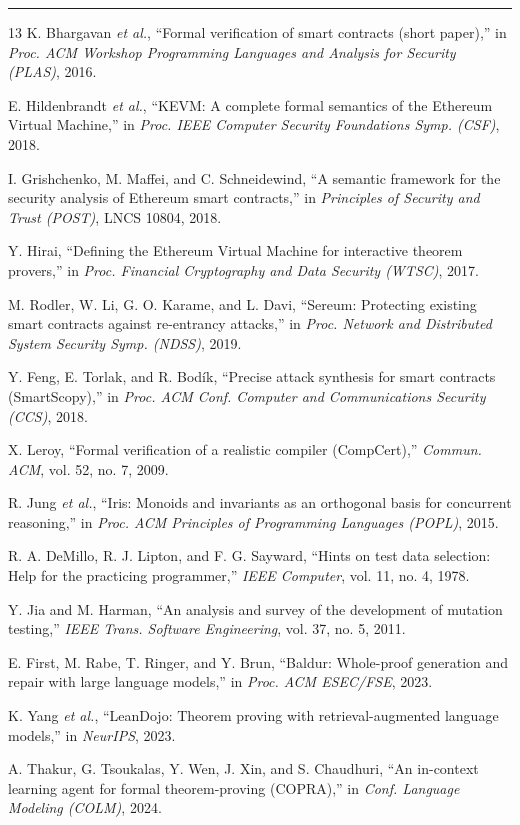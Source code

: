 \begin{center}\rule{0.5\linewidth}{0.5pt}\end{center}

\begin{thebibliography}{13}
K. Bhargavan \emph{et al.}, ``Formal verification of smart contracts (short paper),'' in \emph{Proc. ACM Workshop Programming Languages and Analysis for Security (PLAS)}, 2016.

E. Hildenbrandt \emph{et al.}, ``KEVM: A complete formal semantics of the Ethereum Virtual Machine,'' in \emph{Proc. IEEE Computer Security Foundations Symp. (CSF)}, 2018.

I. Grishchenko, M. Maffei, and C. Schneidewind, ``A semantic framework for the security analysis of Ethereum smart contracts,'' in \emph{Principles of Security and Trust (POST)}, LNCS 10804, 2018.

Y. Hirai, ``Defining the Ethereum Virtual Machine for interactive theorem provers,'' in \emph{Proc. Financial Cryptography and Data Security (WTSC)}, 2017.

M. Rodler, W. Li, G. O. Karame, and L. Davi, ``Sereum: Protecting existing smart contracts against re-entrancy attacks,'' in \emph{Proc. Network and Distributed System Security Symp. (NDSS)}, 2019.

Y. Feng, E. Torlak, and R. Bodík, ``Precise attack synthesis for smart contracts (SmartScopy),'' in \emph{Proc. ACM Conf. Computer and Communications Security (CCS)}, 2018.

X. Leroy, ``Formal verification of a realistic compiler (CompCert),'' \emph{Commun. ACM}, vol. 52, no. 7, 2009.

R. Jung \emph{et al.}, ``Iris: Monoids and invariants as an orthogonal basis for concurrent reasoning,'' in \emph{Proc. ACM Principles of Programming Languages (POPL)}, 2015.

R. A. DeMillo, R. J. Lipton, and F. G. Sayward, ``Hints on test data selection: Help for the practicing programmer,'' \emph{IEEE Computer}, vol. 11, no. 4, 1978.

Y. Jia and M. Harman, ``An analysis and survey of the development of mutation testing,'' \emph{IEEE Trans. Software Engineering}, vol. 37, no. 5, 2011.

E. First, M. Rabe, T. Ringer, and Y. Brun, ``Baldur: Whole-proof generation and repair with large language models,'' in \emph{Proc. ACM ESEC/FSE}, 2023.

K. Yang \emph{et al.}, ``LeanDojo: Theorem proving with retrieval-augmented language models,'' in \emph{NeurIPS}, 2023.

A. Thakur, G. Tsoukalas, Y. Wen, J. Xin, and S. Chaudhuri, ``An in-context learning agent for formal theorem-proving (COPRA),'' in \emph{Conf. Language Modeling (COLM)}, 2024.
\end{thebibliography}
